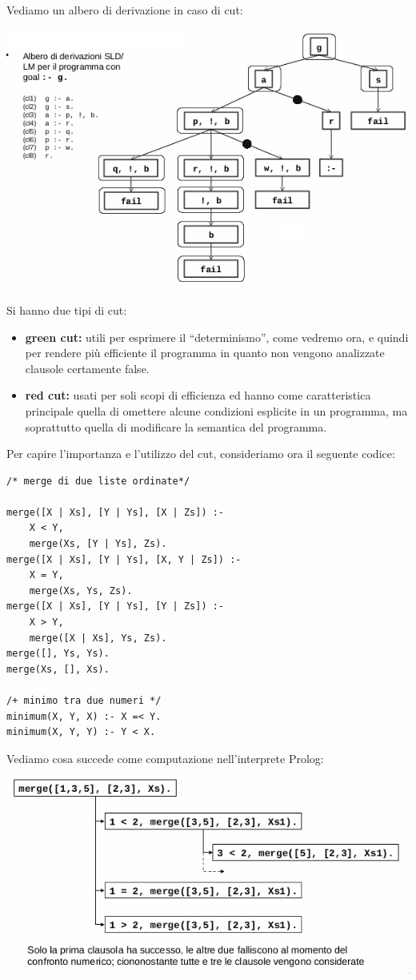 Vediamo un albero di derivazione in caso di cut:
\begin{center}
	\includegraphics[scale=0.8]{img/cut.png}
\end{center}
Si hanno due tipi di cut:
\begin{itemize}
\item \textbf{green cut:} utili per esprimere il “determinismo”, come vedremo ora, e quindi per rendere più efficiente il programma
  in quanto non vengono analizzate clausole certamente false.
\item \textbf{red cut:} usati per soli scopi di efficienza ed hanno come caratteristica principale quella di omettere alcune condizioni
                        esplicite in un programma, ma soprattutto  quella di modificare la semantica del programma.
\end{itemize}
Per capire l'importanza e l'utilizzo del cut, consideriamo ora il seguente codice:
\begin{verbatim}
/* merge di due liste ordinate*/

merge([X | Xs], [Y | Ys], [X | Zs]) :-
	X < Y,
	merge(Xs, [Y | Ys], Zs).
merge([X | Xs], [Y | Ys], [X, Y | Zs]) :-
	X = Y,
	merge(Xs, Ys, Zs).
merge([X | Xs], [Y | Ys], [Y | Zs]) :-
	X > Y,
	merge([X | Xs], Ys, Zs).
merge([], Ys, Ys).
merge(Xs, [], Xs).

/+ minimo tra due numeri */
minimum(X, Y, X) :- X =< Y.
minimum(X, Y, Y) :- Y < X.
\end{verbatim}
Vediamo cosa succede come computazione nell'interprete Prolog:
\begin{center}
\includegraphics[scale=0.8]{img/cut2.png}
\end{center}
